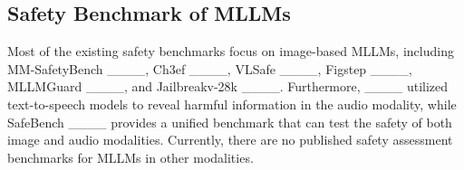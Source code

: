 \subsection{Safety Benchmark of MLLMs}
Most of the existing safety benchmarks focus on image-based MLLMs, including MM-SafetyBench ____, Ch3ef ____, VLSafe ____, Figstep ____, MLLMGuard ____, and Jailbreakv-28k ____.
Furthermore, ____ utilized text-to-speech models to reveal harmful information in the audio modality, while SafeBench ____ provides a unified benchmark that can test the safety of both image and audio modalities. 
Currently, there are no published safety assessment benchmarks for MLLMs in other modalities.
